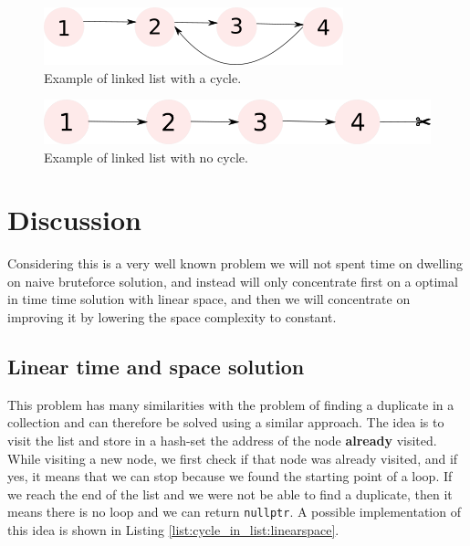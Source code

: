 \begin{figure}
	\centering
	\includegraphics[scale=1.0]{sources/cycle_in_list/images/example1}
	\caption{Example of linked list with a cycle.}
	\label{fig:cycle_in_list:example1}
\end{figure}
\begin{figure}
	\label{fig:cycle_in_list:example2}
	\centering
	\includegraphics[scale=1.0]{sources/cycle_in_list/images/example2}
	\caption{Example of linked list with no cycle.}
\end{figure}

%
%	

\section{Discussion}
\label{cycle_in_list:sec:discussion}
Considering this is a very well known problem we will not spent time on dwelling on naive bruteforce solution, and instead will only concentrate first on a optimal in time time solution with linear space, and then we will concentrate on improving it by lowering the space complexity to constant.

\subsection{Linear time and space solution}
\label{cycle_in_list:sec:bruteforce}
This problem has many similarities with the problem of finding a duplicate in a collection and can therefore be solved using a similar approach. The idea is to visit the list and store in a hash-set the  address of the node \textbf{already} visited. While visiting a new node, we first check if that node was already visited, and if yes, it means that we can stop because we found the starting point of a loop. If we reach the end of the list and we were not be able to find a duplicate, then it means there is no loop and we can return \lstinline[columns=fixed]{nullptr}.
A possible implementation of this idea is shown in Listing \ref{list:cycle_in_list:linearspace}.

